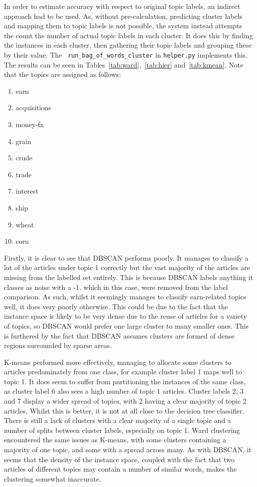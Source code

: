 \documentclass[11pt]{article}
\begin{document}
In order to estimate accuracy with respect to original topic labels, an indirect approach had to be used. As, without pre-calculation, predicting cluster labels and mapping them to topic labels is not possible, the system instead attempts the count the number of actual topic labels in each cluster. It does this by finding the instances in each cluster, then gathering their topic labels and grouping these by their value. The \texttt{ run\_bag\_of\_words\_cluster} in \texttt{helper.py} implements this. The results can be seen in Tables~\ref{tab:ward},~\ref{tab:hier} and~\ref{tab:kmean}. Note that the topics are assigned as follows:
\begin{enumerate}
\item earn
\item acquisitions
\item money-fx
\item grain
\item crude
\item trade
\item interest
\item ship
\item wheat
\item corn
\end{enumerate}
Firstly, it is clear to see that DBSCAN performs poorly. It manages to classify a lot of the articles under topic 1 correctly but the vast majority of the articles are missing from the labelled set entirely. This is because DBSCAN labels anything it classes as noise with a -1, which in this case, were removed from the label comparison. As such, whilst it seemingly manages to classify earn-related topics well, it does very poorly otherwise. This could be due to the fact that the instance space is likely to be very dense due to the reuse of articles for a variety of topics, so DBSCAN would prefer one large cluster to many smaller ones. This is furthered by the fact that DBSCAN assumes clusters are formed of dense regions surrounded by sparse areas.

K-means performed more effectively, managing to allocate some clusters to articles predominately from one class, for example cluster label 1 maps well to topic 1. It does seem to suffer from partitioning the instances of the same class, as cluster label 6 also sees a high number of topic 1 articles. Cluster labels 2, 3 and 7 display a wider spread of topics, with 2 having a clear majority of topic 2 articles. Whilst this is better, it is not at all close to the decision tree classifier. There is still a lack of clusters with a clear majority of a single topic and a number of splits between cluster labels, especially on topic 1. Ward clustering encountered the same issues as K-means, with some clusters containing a majority of one topic, and some with a spread across many. As with DBSCAN, it seems that the density of the instance space, coupled with the fact that two articles of different topics may contain a number of similar words, makes the clustering somewhat inaccurate.
\end{document}
